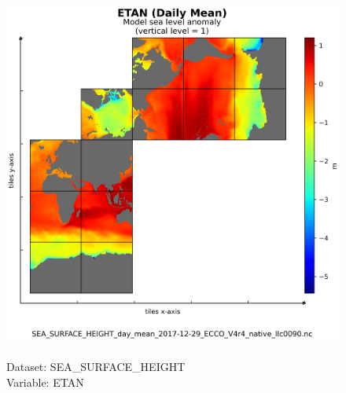 \begin{figure}[H]
\centering
\includegraphics[scale=0.5]{../images/plots/native_plots/Sea_Surface_Height/ETAN.png}
\caption{\\Dataset: SEA\_SURFACE\_HEIGHT\\Variable: ETAN}
\label{tab:table-SEA_SURFACE_HEIGHT_ETAN-Plot}
\end{figure}
\pagebreak
